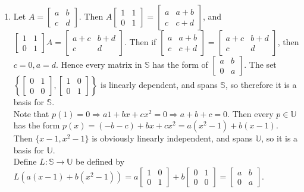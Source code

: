 \documentclass[10pt,english]{article}
\begin{document}
\begin{enumerate}
\begin{enumerate}
    \item Let $A=\begin{bmatrix}a&b\\c&d\end{bmatrix}$. Then $A\begin{bmatrix}1&1\\0&1\end{bmatrix}=\begin{bmatrix}a&a+b\\c&c+d\end{bmatrix}$, and $\begin{bmatrix}1&1\\0&1\end{bmatrix}A=\begin{bmatrix}a+c&b+d\\c&d\end{bmatrix}$. Then if $\begin{bmatrix}a&a+b\\c&c+d\end{bmatrix}=\begin{bmatrix}a+c&b+d\\c&d\end{bmatrix}$, then $c=0,a=d$. Hence every matrix in $\mathbb{S}$ has the form of $\begin{bmatrix}a&b\\0&a\end{bmatrix}$. The set $\left\{\begin{bmatrix}0&1\\0&0\end{bmatrix},\begin{bmatrix}1&0\\0&1\end{bmatrix}\right\}$ is linearly dependent, and spans $\mathbb{S}$, so therefore it is a basis for $\mathbb{S}$. \\ 
    Note that $p(1)=0\Rightarrow a1+bx+cx^2=0\Rightarrow a+b+c=0$. Then every $p\in\mathbb{U}$ has the form $p(x)=(-b-c)+bx+cx^2=a(x^2-1)+b(x-1)$. Then $\{x-1,x^2-1\}$ is obviously linearly independent, and spans $\mathbb{U}$, so it is a basis for $\mathbb{U}$. \\ 
    Define $L:\mathbb{S}\rightarrow\mathbb{U}$ be defined by $L(a(x-1)+b(x^2-1))=a\begin{bmatrix}1&0\\0&1\end{bmatrix}+b\begin{bmatrix}0&1\\0&0\end{bmatrix}=\begin{bmatrix}a&b\\0&a\end{bmatrix}$. \\ 

\end{enumerate}
\end{enumerate}
\end{document}
